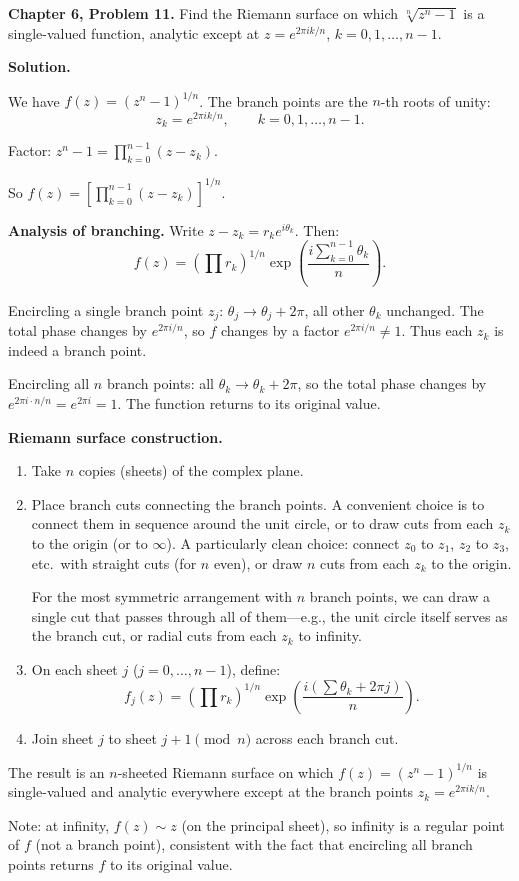 \documentclass[12pt]{article}
\begin{document}
\textbf{Chapter 6, Problem 11.} Find the Riemann surface on which $\sqrt[n]{z^n - 1}$ is a single-valued function, analytic except at $z = e^{2\pi ik/n}$, $k = 0, 1, \ldots, n-1$.

\bigskip
\textbf{Solution.}

We have $f(z) = (z^n - 1)^{1/n}$. The branch points are the $n$-th roots of unity:
\[
z_k = e^{2\pi i k/n}, \qquad k = 0, 1, \ldots, n-1.
\]

Factor: $z^n - 1 = \prod_{k=0}^{n-1}(z - z_k)$.

So $f(z) = \left[\prod_{k=0}^{n-1}(z-z_k)\right]^{1/n}$.

\textbf{Analysis of branching.} Write $z - z_k = r_k e^{i\theta_k}$. Then:
\[
f(z) = \left(\prod r_k\right)^{1/n} \exp\!\left(\frac{i\sum_{k=0}^{n-1}\theta_k}{n}\right).
\]

Encircling a single branch point $z_j$: $\theta_j \to \theta_j + 2\pi$, all other $\theta_k$ unchanged. The total phase changes by $e^{2\pi i/n}$, so $f$ changes by a factor $e^{2\pi i/n} \neq 1$. Thus each $z_k$ is indeed a branch point.

Encircling all $n$ branch points: all $\theta_k \to \theta_k + 2\pi$, so the total phase changes by $e^{2\pi i \cdot n/n} = e^{2\pi i} = 1$. The function returns to its original value.

\textbf{Riemann surface construction.}
\begin{enumerate}
\item Take $n$ copies (sheets) of the complex plane.
\item Place branch cuts connecting the branch points. A convenient choice is to connect them in sequence around the unit circle, or to draw cuts from each $z_k$ to the origin (or to $\infty$). A particularly clean choice: connect $z_0$ to $z_1$, $z_2$ to $z_3$, etc.\ with straight cuts (for $n$ even), or draw $n$ cuts from each $z_k$ to the origin.

For the most symmetric arrangement with $n$ branch points, we can draw a single cut that passes through all of them---e.g., the unit circle itself serves as the branch cut, or radial cuts from each $z_k$ to infinity.

\item On each sheet $j$ ($j = 0, \ldots, n-1$), define:
\[
f_j(z) = \left(\prod r_k\right)^{1/n} \exp\!\left(\frac{i(\sum \theta_k + 2\pi j)}{n}\right).
\]

\item Join sheet $j$ to sheet $j+1 \pmod{n}$ across each branch cut.
\end{enumerate}

The result is an $n$-sheeted Riemann surface on which $f(z) = (z^n-1)^{1/n}$ is single-valued and analytic everywhere except at the branch points $z_k = e^{2\pi ik/n}$.

Note: at infinity, $f(z) \sim z$ (on the principal sheet), so infinity is a regular point of $f$ (not a branch point), consistent with the fact that encircling all branch points returns $f$ to its original value.
\end{document}
